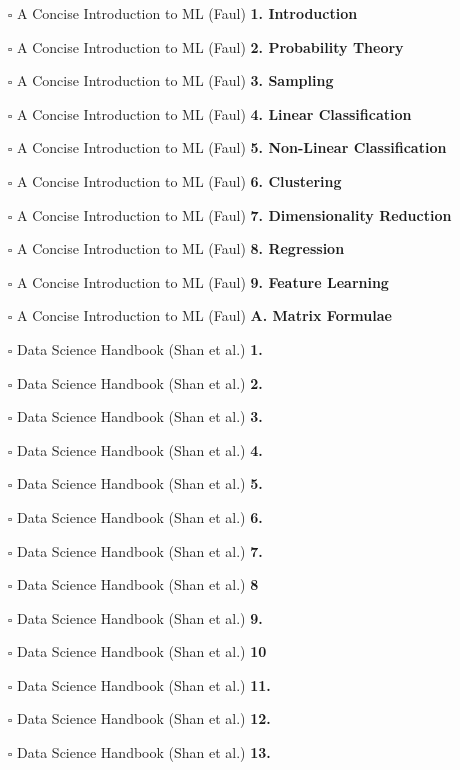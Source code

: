 \documentclass[a4, landscape, 12pt]{article}
\newcommand{\checkbox}{$\square$}%
\begin{document}
\begin{itemize}
{}
\item [\checkbox]  A Concise Introduction to ML (Faul) \textbf{ 1. Introduction
}
\item [\checkbox]  A Concise Introduction to ML (Faul) \textbf{ 2. Probability Theory
}
\item [\checkbox]  A Concise Introduction to ML (Faul) \textbf{ 3. Sampling
}
\item [\checkbox]  A Concise Introduction to ML (Faul) \textbf{ 4. Linear Classification
}
\item [\checkbox]  A Concise Introduction to ML (Faul) \textbf{ 5. Non-Linear Classification
}
\item [\checkbox]  A Concise Introduction to ML (Faul) \textbf{ 6. Clustering
}
\item [\checkbox]  A Concise Introduction to ML (Faul) \textbf{ 7. Dimensionality Reduction
}
\item [\checkbox]  A Concise Introduction to ML (Faul) \textbf{ 8. Regression
}
\item [\checkbox]  A Concise Introduction to ML (Faul) \textbf{ 9. Feature Learning
}
\item [\checkbox]  A Concise Introduction to ML (Faul) \textbf{ A. Matrix Formulae
}
\item [\checkbox]  Data Science Handbook (Shan et al.) \textbf{ 1.
}
\item [\checkbox]  Data Science Handbook (Shan et al.) \textbf{ 2.
}
\item [\checkbox]  Data Science Handbook (Shan et al.) \textbf{ 3.
}
\item [\checkbox]  Data Science Handbook (Shan et al.) \textbf{ 4.
}
\item [\checkbox]  Data Science Handbook (Shan et al.) \textbf{ 5.
}
\item [\checkbox]  Data Science Handbook (Shan et al.) \textbf{ 6.
}
\item [\checkbox]  Data Science Handbook (Shan et al.) \textbf{ 7.
}
\item [\checkbox]  Data Science Handbook (Shan et al.) \textbf{ 8
}
\item [\checkbox]  Data Science Handbook (Shan et al.) \textbf{ 9.
}
\item [\checkbox]  Data Science Handbook (Shan et al.) \textbf{ 10
}
\item [\checkbox]  Data Science Handbook (Shan et al.) \textbf{ 11.
}
\item [\checkbox]  Data Science Handbook (Shan et al.) \textbf{ 12.
}
\item [\checkbox]  Data Science Handbook (Shan et al.) \textbf{ 13.
}
\end{itemize}
\end{document}
